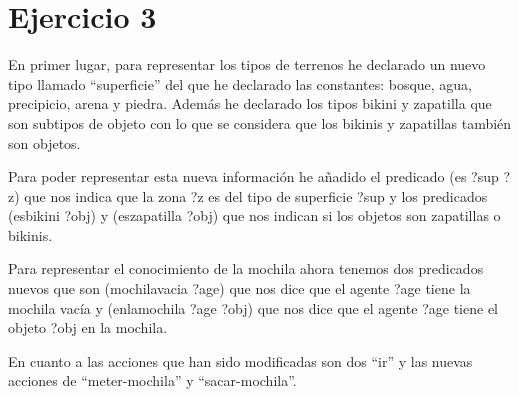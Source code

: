 \documentclass[12pt,a4paper]{article}
\begin{document}

\section{Ejercicio 3}

En primer lugar, para representar los tipos de terrenos he declarado un nuevo tipo llamado ``superficie'' del que he declarado las constantes: bosque, agua, precipicio, arena y piedra. Además he declarado los tipos bikini y zapatilla que son subtipos de objeto con lo que se considera que los bikinis y zapatillas también son objetos.

Para poder representar esta nueva información he añadido el predicado (es ?sup ?z) que nos indica que la zona ?z es del tipo de superficie ?sup y los predicados (esbikini ?obj) y (eszapatilla ?obj) que nos indican si los objetos son zapatillas o bikinis.

Para representar el conocimiento de la mochila ahora tenemos dos predicados nuevos que son (mochilavacia ?age) que nos dice que el agente ?age tiene la mochila vacía y (enlamochila ?age ?obj) que nos dice que el agente ?age tiene el objeto ?obj en la mochila.

En cuanto a las acciones que han sido modificadas son dos ``ir'' y las nuevas acciones de ``meter-mochila'' y ``sacar-mochila''.
\end{document}
